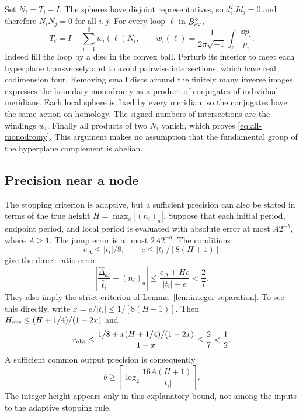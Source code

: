 Set $N_i=T_i-I$. The spheres have disjoint representatives, so
$d_i^TJd_j=0$ and therefore $N_iN_j=0$ for all $i,j$. For every
loop $\ell$ in $B_{\rm ev}^\circ$,
\begin{equation}\label{eq:all-monodromy}
 T_\ell=I+\sum_{i=1}^8w_i(\ell)N_i,
 \qquad
 w_i(\ell)=\frac1{2\pi\sqrt{-1}}\int_\ell\frac{\dd p_i}{p_i}.
\end{equation}
Indeed fill the loop by a disc in the convex ball. Perturb its interior
to meet each hyperplane transversely and to avoid pairwise intersections,
which have real codimension four. Removing small discs around the
finitely many inverse images expresses the boundary monodromy as a
product of conjugates of individual meridians. Each local sphere is
fixed by every meridian, so the conjugates have the same action on
homology. The signed numbers of intersections are the windings $w_i$.
Finally all products of two $N_i$ vanish, which proves
\eqref{eq:all-monodromy}. This argument makes no assumption that
the fundamental group of the hyperplane complement is abelian.

\subsection{Precision near a node}

The stopping criterion is adaptive, but a sufficient precision can
also be stated in terms of the true height
$H=\max_a|(n_i)_a|$. Suppose that each initial period, endpoint
period, and local period is evaluated with absolute error at most
$A2^{-b}$, where $A\ge1$. The jump error is at most $2A2^{-b}$.
The conditions
\begin{equation}\label{eq:height-sufficient}
 e_\Delta\le |t_i|/8,
 \qquad e\le |t_i|/[8(H+1)]
\end{equation}
give the direct ratio error
\[
 \left|\frac{\widehat\Delta_{ai}}{\widehat t_i}-(n_i)_a\right|
 \le\frac{e_\Delta+He}{|t_i|-e}<\frac27.
\]
They also imply the strict criterion of
Lemma~\ref{lem:integer-separation}. To see this directly, write
$x=e/|t_i|\le1/[8(H+1)]$. Then
$H_{\rm obs}\le(H+1/4)/(1-2x)$ and
\[
 r_{\rm obs}\le
 \frac{1/8+x(H+1/4)/(1-2x)}{1-x}
 \le\frac27<\frac12.
\]
A sufficient common output precision is consequently
\begin{equation}\label{eq:digit-count}
       b\ge\left\lceil\log_2
                      \frac{16A(H+1)}{|t_i|}\right\rceil.
\end{equation}
The integer height appears only in this explanatory bound, not among
the inputs to the adaptive stopping rule.

